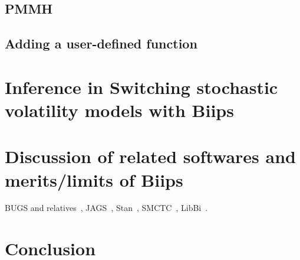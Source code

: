\documentclass[article,shortnames]{jss}
\begin{document}
\subsection{PMMH}


\subsection{Adding a user-defined function}






\section{Inference in Switching stochastic volatility models with Biips}
\label{sec:switchingstochasticvolatility}



\section{Discussion of related softwares and merits/limits of Biips}
\label{sec:discussion}
BUGS and relatives~\citep{Lunn2000,Lunn2012}, JAGS~\citep{Plummer2003}, Stan~\citep{Stan2013}, SMCTC~\citep{Johansen2009}, LibBi~\citep{Murray2013}.

\section{Conclusion}
\label{sec:conclusion}




\end{document}
